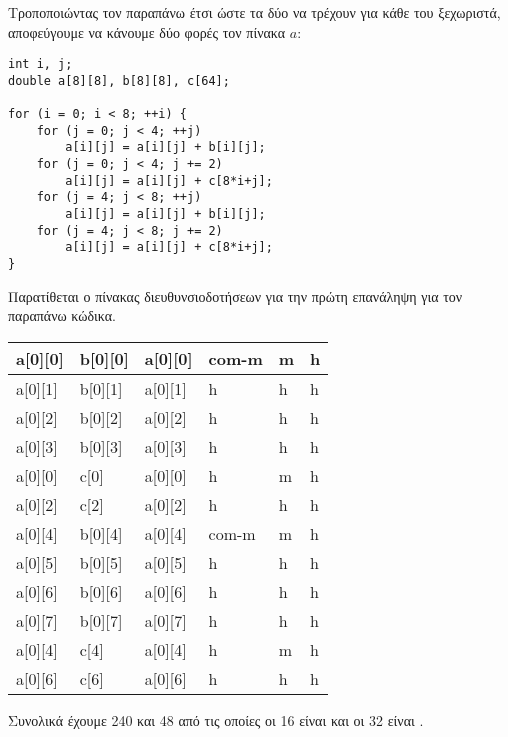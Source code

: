 \documentclass[10pt]{assignment}f
\begin{document}
\newpage

Τροποποιώντας τον παραπάνω έτσι ώστε τα δύο  να τρέχουν για κάθε  του  ξεχωριστά, αποφεύγουμε να κάνουμε δύο φορές  τον πίνακα $a$:

\begin{center}
\begin{verbatim}
int i, j;
double a[8][8], b[8][8], c[64];

for (i = 0; i < 8; ++i) {
    for (j = 0; j < 4; ++j) 
        a[i][j] = a[i][j] + b[i][j];
    for (j = 0; j < 4; j += 2) 
        a[i][j] = a[i][j] + c[8*i+j];
    for (j = 4; j < 8; ++j)
        a[i][j] = a[i][j] + b[i][j];
    for (j = 4; j < 8; j += 2)
        a[i][j] = a[i][j] + c[8*i+j];
}
\end{verbatim}
\end{center}

Παρατίθεται ο πίνακας διευθυνσιοδοτήσεων για την πρώτη επανάληψη για τον παραπάνω κώδικα.

\begin{center}
\begin{tabularx}{\textwidth}{|Y|Y|Y|Y|Y|Y|}
\hline
a[0][0] & b[0][0] & a[0][0] & com-m & m & h \\ 
\hline
a[0][1] & b[0][1] & a[0][1] & h & h & h \\ 
\hline
a[0][2] & b[0][2] & a[0][2] & h & h & h \\ 
\hline
a[0][3] & b[0][3] & a[0][3] & h & h & h \\ 
\hline
a[0][0] & c[0]    & a[0][0] & h & m & h \\ 
\hline
a[0][2] & c[2]    & a[0][2] & h & h & h \\ 
\hline
a[0][4] & b[0][4] & a[0][4] & com-m & m & h \\ 
\hline
a[0][5] & b[0][5] & a[0][5] & h & h & h \\ 
\hline
a[0][6] & b[0][6] & a[0][6] & h & h & h \\ 
\hline
a[0][7] & b[0][7] & a[0][7] & h & h & h \\ 
\hline
a[0][4] & c[4]    & a[0][4] & h & m & h \\ 
\hline
a[0][6] & c[6]    & a[0][6] & h & h & h \\
\hline
\end{tabularx}
\end{center}
\vspace{4pt}
Συνολικά έχουμε 240  και 48  από τις οποίες οι 16 είναι  και οι 32 είναι . 
\end{document}
